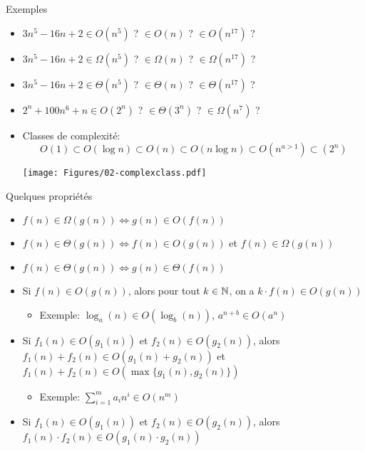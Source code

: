 \begin{frame}{Exemples}
\begin{itemize}
\item $3n^5-16n+2\in O(n^5)$ ? $\in O(n)$ ? $\in O(n^{17})$ ?
\item $3n^5-16n+2\in \Omega(n^5)$ ? $\in \Omega(n)$ ? $\in \Omega(n^{17})$ ?
\item $3n^5-16n+2\in \Theta(n^5)$ ? $\in \Theta(n)$ ? $\in \Theta(n^{17})$ ?
\item $2^n+100n^6+n \in O(2^n)$ ? $\in \Theta(3^n)$ ? $\in \Omega(n^7)$ ?

\bigskip

\item Classes de complexité:
$$O(1)\subset O(\log n)\subset O(n) \subset O(n\log n) \subset O(n^{a>1})\subset (2^n)$$
\centerline{\texttt{[image: Figures/02-complexclass.pdf]}}
\end{itemize}
\end{frame}

\begin{frame}{Quelques propriétés}
\small
\begin{itemize}
\item $f(n)\in\Omega(g(n)) \Leftrightarrow g(n)\in O(f(n))$
\item $f(n)\in\Theta(g(n))\Leftrightarrow f(n)\in O(g(n))$ et $f(n)\in \Omega(g(n))$
\item $f(n)\in\Theta(g(n))\Leftrightarrow g(n)\in\Theta(f(n))$
\bigskip
\item Si $f(n)\in O(g(n))$, alors pour tout $k\in \mathbb{N}$, on a $k\cdot f(n)\in O(g(n))$
\begin{itemize}
\item Exemple: $\log_a(n)\in O(\log_b(n))$, $a^{n+b}\in O(a^n)$
\end{itemize}
\item Si $f_1(n)\in O(g_1(n))$ et $f_2(n)\in O(g_2(n))$, alors $f_1(n)+f_2(n)\in O(g_1(n)+g_2(n))$ et $f_1(n)+f_2(n)\in O(\max\{g_1(n),g_2(n)\})$
\begin{itemize}
\item Exemple: $\sum_{i=1}^m a_i n^i\in O(n^m)$
\end{itemize}
\item Si $f_1(n)\in O(g_1(n))$ et $f_2(n)\in O(g_2(n))$, alors $f_1(n)\cdot f_2(n)\in O(g_1(n)\cdot g_2(n))$
\end{itemize}
\end{frame}

